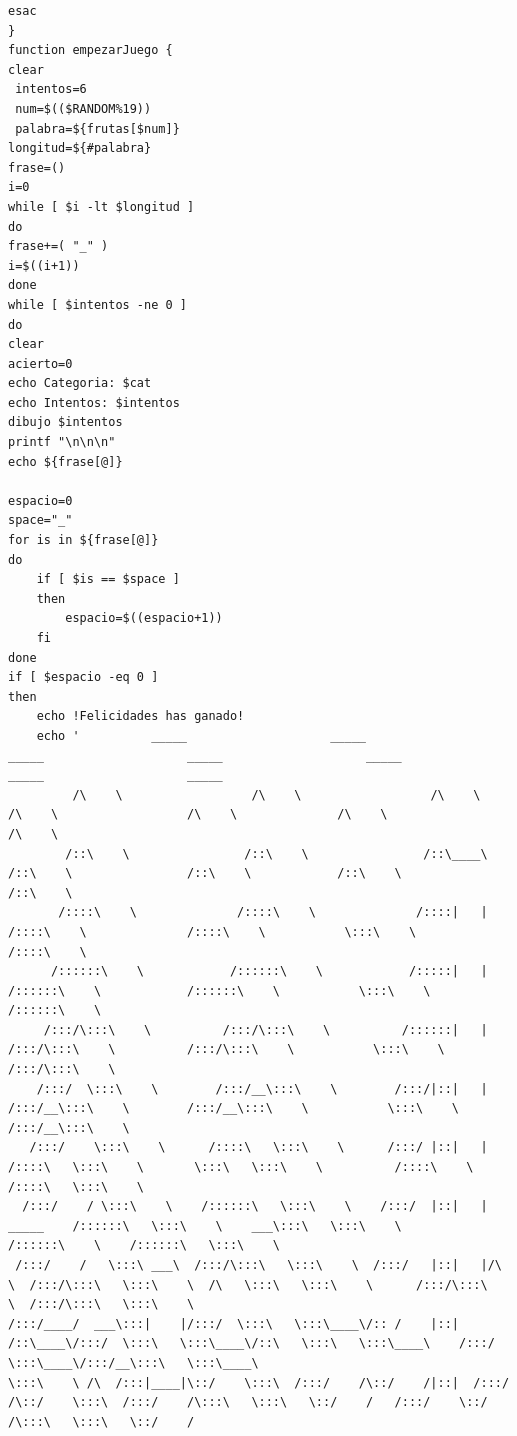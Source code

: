 \documentclass[12pt,a4paper]{article}
\begin{document}
\begin{lstlisting}[style=BashInputStyle]
  esac      
}
function empezarJuego {
clear   
 intentos=6   
 num=$(($RANDOM%19))
 palabra=${frutas[$num]}
longitud=${#palabra}
frase=()
i=0
while [ $i -lt $longitud ]
do
frase+=( "_" )
i=$((i+1))
done
while [ $intentos -ne 0 ]
do
clear
acierto=0
echo Categoria: $cat
echo Intentos: $intentos
dibujo $intentos
printf "\n\n\n"
echo ${frase[@]}

espacio=0
space="_"
for is in ${frase[@]}
do
    if [ $is == $space ]
    then
        espacio=$((espacio+1))
    fi
done
if [ $espacio -eq 0 ]
then
    echo !Felicidades has ganado!
    echo '          _____                    _____                    _____                    _____                    _____                _____                    _____          
         /\    \                  /\    \                  /\    \                  /\    \                  /\    \              /\    \                  /\    \         
        /::\    \                /::\    \                /::\____\                /::\    \                /::\    \            /::\    \                /::\    \        
       /::::\    \              /::::\    \              /::::|   |               /::::\    \              /::::\    \           \:::\    \              /::::\    \       
      /::::::\    \            /::::::\    \            /:::::|   |              /::::::\    \            /::::::\    \           \:::\    \            /::::::\    \      
     /:::/\:::\    \          /:::/\:::\    \          /::::::|   |             /:::/\:::\    \          /:::/\:::\    \           \:::\    \          /:::/\:::\    \     
    /:::/  \:::\    \        /:::/__\:::\    \        /:::/|::|   |            /:::/__\:::\    \        /:::/__\:::\    \           \:::\    \        /:::/__\:::\    \    
   /:::/    \:::\    \      /::::\   \:::\    \      /:::/ |::|   |           /::::\   \:::\    \       \:::\   \:::\    \          /::::\    \      /::::\   \:::\    \   
  /:::/    / \:::\    \    /::::::\   \:::\    \    /:::/  |::|   | _____    /::::::\   \:::\    \    ___\:::\   \:::\    \        /::::::\    \    /::::::\   \:::\    \  
 /:::/    /   \:::\ ___\  /:::/\:::\   \:::\    \  /:::/   |::|   |/\    \  /:::/\:::\   \:::\    \  /\   \:::\   \:::\    \      /:::/\:::\    \  /:::/\:::\   \:::\    \ 
/:::/____/  ___\:::|    |/:::/  \:::\   \:::\____\/:: /    |::|   /::\____\/:::/  \:::\   \:::\____\/::\   \:::\   \:::\____\    /:::/  \:::\____\/:::/__\:::\   \:::\____\
\:::\    \ /\  /:::|____|\::/    \:::\  /:::/    /\::/    /|::|  /:::/    /\::/    \:::\  /:::/    /\:::\   \:::\   \::/    /   /:::/    \::/    /\:::\   \:::\   \::/    /

\end{lstlisting}
\end{document}
